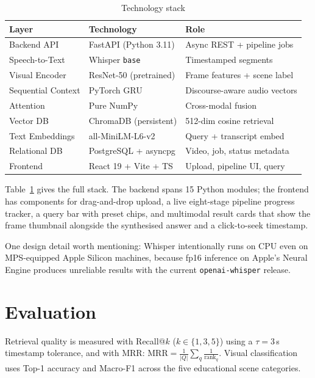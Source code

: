 \documentclass[conference]{IEEEtran}
\begin{document}
\begin{table}[ht]
\centering
\caption{Technology stack}
\label{tab:stack}
\setlength{\tabcolsep}{4pt}
\begin{tabular}{@{}lll@{}}
\toprule
\textbf{Layer} & \textbf{Technology} & \textbf{Role} \\ \midrule
Backend API        & FastAPI (Python 3.11)  & Async REST + pipeline jobs \\
Speech-to-Text     & Whisper \texttt{base}  & Timestamped segments \\
Visual Encoder     & ResNet-50 (pretrained) & Frame features + scene label \\
Sequential Context & PyTorch GRU            & Discourse-aware audio vectors \\
Attention          & Pure NumPy             & Cross-modal fusion \\
Vector DB          & ChromaDB (persistent)  & 512-dim cosine retrieval \\
Text Embeddings    & all-MiniLM-L6-v2       & Query + transcript embed \\
Relational DB      & PostgreSQL + asyncpg   & Video, job, status metadata \\
Frontend           & React 19 + Vite + TS   & Upload, pipeline UI, query \\
\bottomrule
\end{tabular}
\end{table}

Table~\ref{tab:stack} gives the full stack. The backend spans 15 Python
modules; the frontend has components for drag-and-drop upload, a live
eight-stage pipeline progress tracker, a query bar with preset chips, and
multimodal result cards that show the frame thumbnail alongside the
synthesised answer and a click-to-seek timestamp.

One design detail worth mentioning: Whisper intentionally runs on CPU
even on MPS-equipped Apple Silicon machines, because fp16 inference on
Apple's Neural Engine produces unreliable results with the current
\texttt{openai-whisper} release.

\section{Evaluation}

Retrieval quality is measured with Recall@$k$ ($k \in \{1,3,5\}$) using a
$\tau=3$\,s timestamp tolerance, and with MRR:
$\text{MRR}=\frac{1}{|Q|}\sum_q \frac{1}{\text{rank}_q}$.
Visual classification uses Top-1 accuracy and Macro-F1 across the five
educational scene categories.
\end{document}
